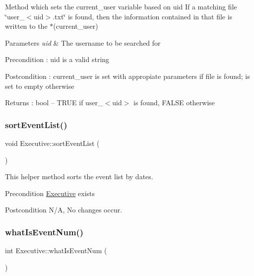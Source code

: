 Method which sets the current\+\_\+user variable based on uid If a matching file \char`\"{}user\+\_\+$<$uid$>$.\+txt\char`\"{} is found, then the information contained in that file is written to the $\ast$(current\+\_\+user) 
\begin{DoxyParams}{Parameters}
{\em uid} & The username to be searched for \\
\hline
\end{DoxyParams}
\begin{DoxyPrecond}{Precondition}
\+: uid is a valid string 
\end{DoxyPrecond}
\begin{DoxyPostcond}{Postcondition}
\+: current\+\_\+user is set with appropiate parameters if file is found; is set to empty otherwise 
\end{DoxyPostcond}
\begin{DoxyReturn}{Returns}
\+: bool -- T\+R\+UE if user\+\_\+$<$uid$>$ is found, F\+A\+L\+SE otherwise 
\end{DoxyReturn}
\mbox{\label{class_executive_a63e7fcccc1e3992eaef93630ecc2a160}} 
\subsubsection{\texorpdfstring{sort\+Event\+List()}{sortEventList()}}
{\footnotesize\ttfamily void Executive\+::sort\+Event\+List (\begin{DoxyParamCaption}{ }\end{DoxyParamCaption})}

This helper method sorts the event list by dates. \begin{DoxyPrecond}{Precondition}
\mbox{\hyperlink{class_executive}{Executive}} exists 
\end{DoxyPrecond}
\begin{DoxyPostcond}{Postcondition}
N/A, No changes occur. 
\end{DoxyPostcond}
\mbox{\label{class_executive_a1e769171afd89ec03795717057642d5a}} 
\subsubsection{\texorpdfstring{what\+Is\+Event\+Num()}{whatIsEventNum()}}
{\footnotesize\ttfamily int Executive\+::what\+Is\+Event\+Num (\begin{DoxyParamCaption}{ }\end{DoxyParamCaption})}

